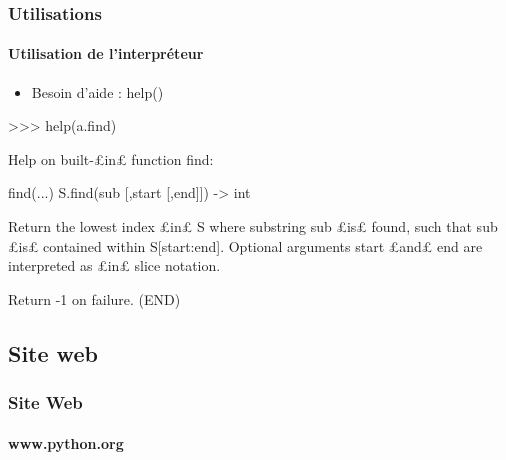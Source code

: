 \begin{frame}[fragile]
\frametitle{Utilisations}
\framesubtitle{Utilisation de l'interpréteur}
\begin{itemize}
 \item Besoin d'aide : help()
\end{itemize}
\begin{pythonConsole}
>>> help(a.find)

Help on built-£in£ function find:

find(...)
    S.find(sub [,start [,end]]) -> int
    
    Return the lowest index £in£ S where substring sub £is£ found,
    such that sub £is£ contained within S[start:end].  Optional
    arguments start £and£ end are interpreted as £in£ slice notation.
    
    Return -1 on failure.
(END) 
\end{pythonConsole}
\end{frame}
\subsection{Site web}
\begin{frame}
\frametitle{Site Web}
\framesubtitle{www.python.org}
\end{frame}
